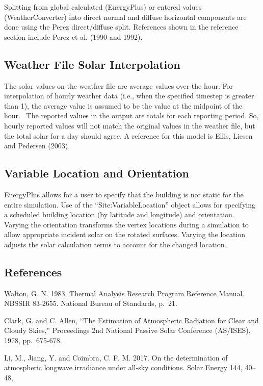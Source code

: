 Splitting from global calculated (EnergyPlus) or entered values (WeatherConverter) into direct normal and diffuse horizontal components are done using the Perez direct/diffuse split. References shown in the reference section include Perez et al. (1990 and 1992).

\subsection{Weather File Solar Interpolation}\label{weather-file-solar-interpolation}

The solar values on the weather file are average values over the hour. For interpolation of hourly weather data (i.e., when the specified timestep is greater than 1), the average value is assumed to be the value at the midpoint of the hour.~ The reported values in the output are totals for each reporting period. So, hourly reported values will not match the original values in the weather file, but the total solar for a day should agree. A reference for this model is Ellis, Liesen and Pedersen (2003).

\subsection{Variable Location and Orientation}\label{variable-location-orientation}

EnergyPlus allows for a user to specify that the building is not static for the entire simulation.
Use of the ``Site:VariableLocation'' object allows for specifying a scheduled building location (by latitude and longitude) and orientation.
Varying the orientation transforms the vertex locations during a simulation to allow appropriate incident solar on the rotated surfaces.
Varying the location adjusts the solar calculation terms to account for the changed location.

\subsection{References}\label{references-010}

Walton, G. N. 1983. Thermal Analysis Research Program Reference Manual. NBSSIR 83-2655. National Bureau of Standards, p.~21.

Clark, G. and C. Allen, ``The Estimation of Atmospheric Radiation for Clear and Cloudy Skies,'' Proceedings 2nd National Passive Solar Conference (AS/ISES), 1978, pp.~675-678.

Li, M., Jiang, Y. and Coimbra, C. F. M. 2017. On the determination of atmospheric longwave irradiance under all-sky conditions. Solar Energy 144,  40–48, 

